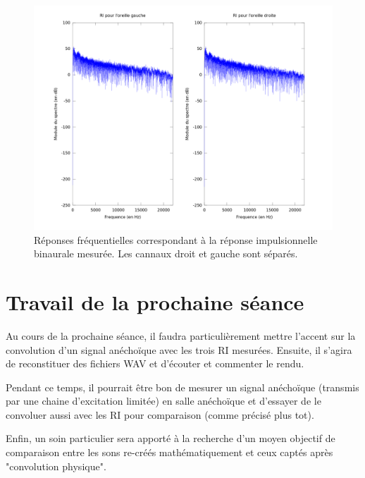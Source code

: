 \documentclass[12pt]{article}
\begin{document}
\begin{figure}[h]
    \vfill\begin{center}
        \includegraphics[scale=0.4]{ri_binaurale.png}
    \end{center}\vfill
    \caption{\label{spectre2} Réponses fréquentielles correspondant à la réponse impulsionnelle binaurale mesurée. Les
    cannaux droit et gauche sont séparés.}
\end{figure}

\section{Travail de la prochaine séance} %

Au cours de la prochaine séance, il faudra particulièrement mettre l'accent sur la convolution d'un signal anéchoïque
avec les trois RI mesurées. Ensuite, il s'agira de reconstituer des fichiers WAV et d'écouter et commenter le rendu.

Pendant ce temps, il pourrait être bon de mesurer un signal anéchoïque (transmis par une chaine d'excitation limitée) en
salle anéchoïque et d'essayer de le convoluer aussi avec les RI pour comparaison (comme précisé plus tot).

Enfin, un soin particulier sera apporté à la recherche d'un moyen objectif de comparaison entre les sons re-créés
mathématiquement et ceux captés après "convolution physique".

\end{document}
